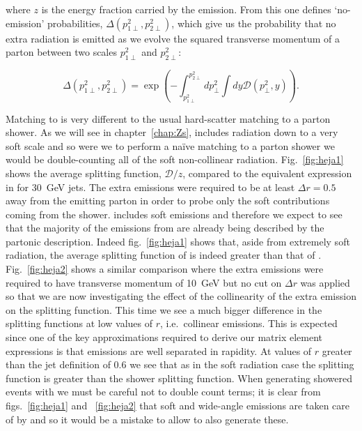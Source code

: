 		where $z$ is the energy fraction carried by the emission.  From this one defines `no-emission'
		probabilities, $\Delta(p_{1\perp}^2, p_{2\perp}^2)$, which
		give us the probability that no extra radiation is emitted as we evolve the squared transverse
		momentum of a parton between two scales $p_{1\perp}^2$ and $p_{2\perp}^2$:

		\begin{equation}
			\Delta(p_{1\perp}^2, p_{2\perp}^2) = \exp\left(-\int_{p_{1\perp}^2}^{p_{2\perp}^2}dp_{\perp}^2
			\int dy\mathcal{D}(p_\perp^2, y)\right).
		\end{equation}

		Matching \HEJ to \ARIADNE is very different to the usual hard-scatter matching to a parton shower. As we
		will see in chapter~\ref{chap:Zs}, \HEJ includes radiation down to a very soft scale and so were we to perform
		a na\"ive matching to a parton shower we would be double-counting all of the soft non-collinear radiation.
		Fig.~\eqref{fig:heja1} shows the average \ARIADNE splitting function, $\mathcal{D}/z$, compared to
		the equivalent expression in \HEJ for 30~GeV jets.  The extra emissions were required to be at least
		$\Delta r=0.5$ away from the emitting parton in order to probe only the soft contributions coming from
		the shower.  \HEJ includes soft emissions and therefore we expect to see that the majority of
		the emissions from \ARIADNE are already being described by the partonic description.  Indeed fig.~\eqref{fig:heja1}
		shows that, aside from extremely soft radiation, the average splitting function of \HEJ is indeed greater than that of
		\ARIADNE. Fig.~\eqref{fig:heja2} shows a similar comparison where the extra emissions were required to have
		transverse momentum of 10~GeV but no cut on $\Delta r$ was applied so that we are now investigating the effect of
		the collinearity of the extra emission on the splitting function.  This time we see a much bigger difference in
		the splitting functions at low values of $r$, i.e.~collinear emissions.  This is expected since one of the key
		approximations required to derive our matrix element expressions is that emissions are well separated in rapidity.
		At values of $r$ greater than the jet definition of 0.6 we see that as in the soft
		radiation case the \HEJ splitting function is greater than the shower splitting function.  When generating showered
		events with \HEJA we must be careful not to double count terms; it is clear from figs.~\eqref{fig:heja1} and
		~\eqref{fig:heja2} that soft and wide-angle emissions are taken care of by \HEJ and so it would be a mistake
		to allow \ARIADNE to also generate these.

